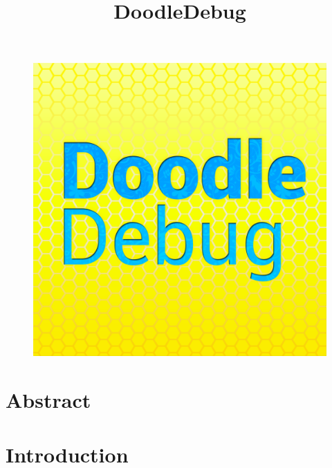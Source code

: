 \documentclass{report}
\title{DoodleDebug}
\begin{document}
\maketitle
\begin{figure}
	\includegraphics[scale=0.25]{img/DoodleDebug-logo.png}
\end{figure}

\chapter*{Abstract}

\chapter*{Introduction}
\end{document}
